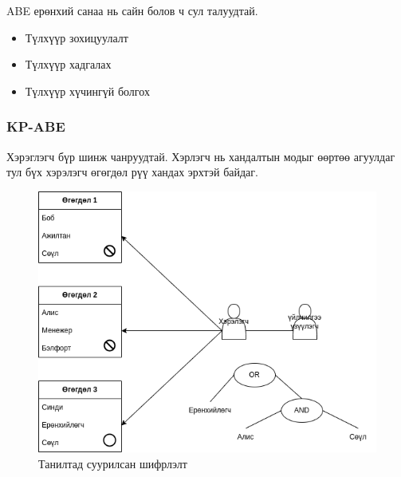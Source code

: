 ABE ерөнхий санаа нь сайн болов ч сул талуудтай.
\begin{itemize}
    \item Түлхүүр зохицуулалт
    \item Түлхүүр хадгалах
    \item Түлхүүр хүчингүй болгох
\end{itemize}

\subsubsection*{KP-ABE}
Хэрэглэгч бүр шинж чанруудтай. Хэрлэгч нь хандалтын модыг өөртөө агуулдаг тул бүх хэрэлэгч өгөгдөл рүү хандах эрхтэй байдаг.
\begin{figure}[ht]
    \centering
    \includegraphics[scale=0.6]{Figures/kp-abe.drawio.png}
    \caption[IBE]{Танилтад суурилсан шифрлэлт}
\label{fig:kp-abe}
\end{figure}


